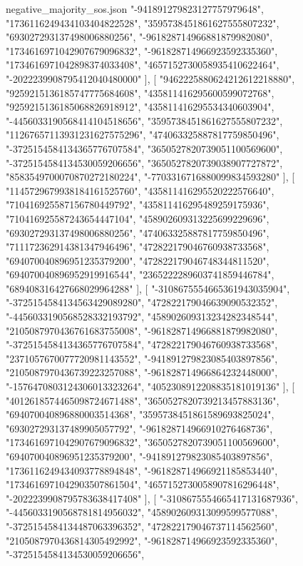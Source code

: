 \begin{filecontents*}[overwrite]{negative_majority_sos.json}
    "-941891279823127757979648",
    "1736116249434103404822528",
    "3595738451861627555807232",
    "693027293137498006880256",
    "-961828714966881879982080",
    "1734616971042907679096832",
    "-961828714966923592335360",
    "1734616971042898374033408",
    "4657152730058935410622464",
    "-2022239908795412040480000"
   ],
   [
    "9462225880624212612218880",
    "9259215136185747775684608",
    "435811416295600599072768",
    "9259215136185068826918912",
    "435811416295534340603904",
    "-4456033190568414104518656",
    "3595738451861627555807232",
    "11267657113931231627575296",
    "474063325887817759850496",
    "-3725154584134365776707584",
    "3650527820739051100569600",
    "-3725154584134530059206656",
    "3650527820739038907727872",
    "8583549700070870272180224",
    "-7703316716880099834593280"
   ],
   [
    "1145729679938184161525760",
    "435811416295520222576640",
    "710416925587156780449792",
    "435811416295489259175936",
    "710416925587243654447104",
    "458902609313225699229696",
    "693027293137498006880256",
    "474063325887817759850496",
    "711172362914381347946496",
    "472822179046760938733568",
    "694070040896951235379200",
    "472822179046748344811520",
    "694070040896952919916544",
    "2365222289603741859446784",
    "689408316427668029964288"
   ],
   [
    "-3108675554665361943035904",
    "-3725154584134563429089280",
    "472822179046639090532352",
    "-4456033190568528332193792",
    "458902609313234282348544",
    "2105087970436761683755008",
    "-961828714966881879982080",
    "-3725154584134365776707584",
    "472822179046760938733568",
    "2371057670077720981143552",
    "-941891279823085403897856",
    "2105087970436739223257088",
    "-961828714966864232448000",
    "-1576470803124306013323264",
    "4052308912208835181019136"
   ],
   [
    "4012618574465098724671488",
    "3650527820739213457883136",
    "694070040896880003514368",
    "3595738451861589693825024",
    "693027293137489905057792",
    "-961828714966910276468736",
    "1734616971042907679096832",
    "3650527820739051100569600",
    "694070040896951235379200",
    "-941891279823085403897856",
    "1736116249434093778894848",
    "-961828714966921185853440",
    "1734616971042903507861504",
    "4657152730058907816296448",
    "-2022239908795783638417408"
   ],
   [
    "-3108675554665417131687936",
    "-4456033190568781814956032",
    "458902609313099599577088",
    "-3725154584134487063396352",
    "472822179046737114562560",
    "2105087970436814305492992",
    "-961828714966923592335360",
    "-3725154584134530059206656",

\end{filecontents*}

